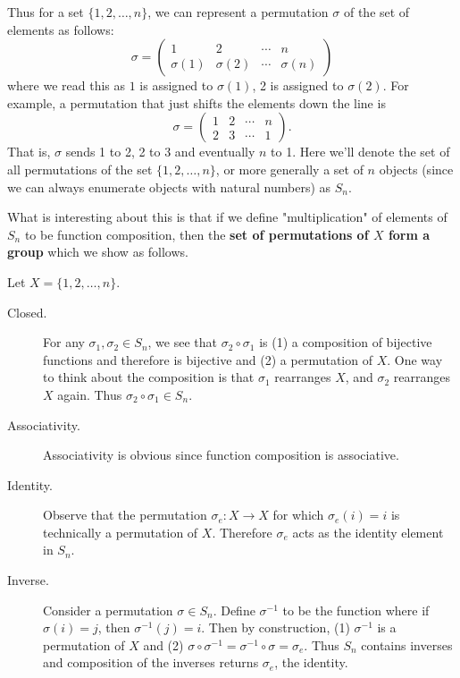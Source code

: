     Thus for a set $\{1, 2, \dots, n\}$, we can represent a
    permutation $\sigma$ of the set of elements as follows:
    \[
       \sigma =  
       \begin{pmatrix}
            1 & 2 & \cdots & n\\
            \sigma(1) & \sigma(2) & \cdots & \sigma(n)
         \end{pmatrix}
    \]
    where we read this as $1$ is assigned to $\sigma(1)$, 2 is
    assigned to $\sigma(2)$. For example, a permutation that just
    shifts the elements down the line is 
    \[
        \sigma = 
        \begin{pmatrix}
            1 & 2 & \cdots & n\\
            2 & 3 & \cdots & 1
         \end{pmatrix}.
    \]
    That is, $\sigma$ sends 1 to 2, 2 to 3 and eventually $n$ to 1. 
    Here we'll denote the set of all permutations of the set $\{1, 2,
    \dots, n\}$, or more generally a set of $n$ objects (since we can
    always enumerate objects with natural numbers) as $S_n$.
    
    \textcolor{NavyBlue}{What is interesting about this is that if we define
    "multiplication" of elements of $S_n$ to be function composition,
    then the 
     \textbf{set of permutations
    of $X$ form a group} which we show as follows.}
    
    Let $X = \{1, 2, \dots, n\}$. 
    \begin{description}
        \item[Closed.]
        For any $\sigma_1, \sigma_2 \in S_n$, we see that $\sigma_2
        \circ \sigma_1$ is (1) a composition of bijective functions
        and therefore is bijective and (2) a permutation of $X$. One
        way to think about the composition is that $\sigma_1$
        rearranges $X$, and
        $\sigma_2$ rearranges $X$ again. Thus $\sigma_2 \circ \sigma_1
        \in S_n$. 

        \item[Associativity.]
        Associativity is obvious since function composition is
        associative. 

        \item[Identity.]
        Observe that the permutation $\sigma_e: X \to X$ for which 
        $\sigma_e(i) = i$ is technically a permutation of $X$.
        Therefore $\sigma_e$ acts as the identity element in $S_n$. 

        \item[Inverse.]
        Consider a permutation $\sigma \in S_n$. Define $\sigma^{-1}$
        to be the function where if $\sigma(i) = j$, then
        $\sigma^{-1}(j) = i$. Then by construction, (1) $\sigma^{-1}$ is a permutation
        of $X$ and (2) $\sigma \circ \sigma^{-1} = \sigma^{-1} \circ
        \sigma = \sigma_e$. Thus $S_n$ contains inverses and
        composition of the inverses returns $\sigma_e$, the identity.
    \end{description}

